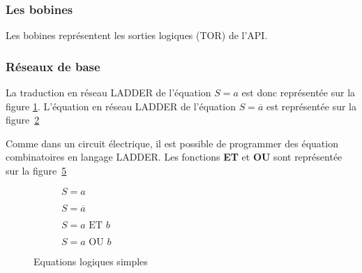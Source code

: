 \subsubsection{Les bobines}

Les bobines représentent les sorties logiques (TOR) de l'API.



\subsubsection{Réseaux de base}

La traduction en réseau LADDER de l'équation $S = a$ est donc représentée sur la figure \ref{fig:ladAtoS}. L'équation en réseau LADDER de l'équation $S = \overline{a}$ est représentée sur la figure~\ref{fig:ladABartoS}

Comme dans un circuit électrique, il est possible de programmer des équation combinatoires en langage LADDER. Les fonctions \textbf{ET} et \textbf{OU} sont représentée sur la figure~\ref{fig:equaLogiques}

\begin{figure}[ht]
\begin{subfigure}[b]{.49\textwidth}
\centering
  
  \caption{$S = a$}
  \label{fig:ladAtoS}
\end{subfigure}
%
\begin{subfigure}[b]{.49\textwidth}
\centering
  
  \caption{$S = \overline{a}$}
  \label{fig:ladABartoS}
\end{subfigure}

  \begin{subfigure}[b]{.49\textwidth}
    \centering
    
    \caption{$S = a \text{ ET } b$}
    \label{fig:aETb}
  \end{subfigure}
  \begin{subfigure}[b]{.49\textwidth}
    \centering
    
    \caption{$S = a \text{ OU } b$}
    \label{fig:aOUb}
  \end{subfigure}
  \caption{Equations logiques simples}
  \label{fig:equaLogiques}
\end{figure}


